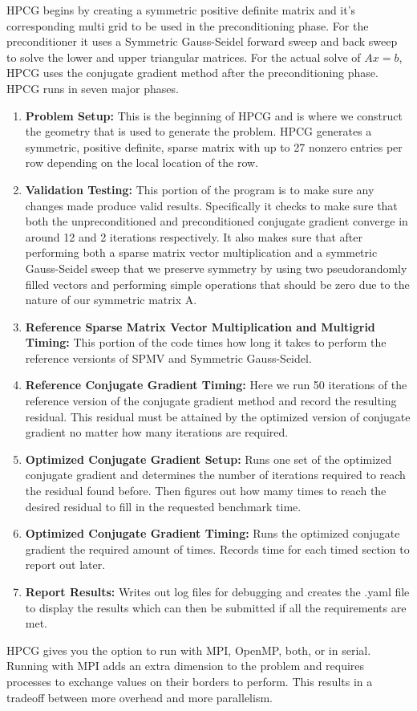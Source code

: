 \documentclass{ccr15}
\begin{document}
HPCG begins by creating a symmetric positive definite matrix and it's corresponding multi grid
to be used in the preconditioning phase. For the preconditioner it uses a Symmetric Gauss-Seidel
forward sweep and back sweep to solve the lower and upper triangular matrices. For the actual
solve of $A x = b$, HPCG uses the conjugate gradient method after the preconditioning phase.
HPCG runs in seven major phases.
\begin{enumerate}
\item \textbf{Problem Setup:} This is the beginning of HPCG and is where we construct the
geometry that is used to generate the problem. HPCG generates a symmetric, positive definite,
sparse matrix with up to 27 nonzero entries per row depending on the local location of the row.
\item \textbf{Validation Testing:} This portion of the program is to make sure any changes
made produce valid results. Specifically it checks to make sure that both the unpreconditioned
and preconditioned conjugate gradient converge in around 12 and 2 iterations respectively. It
also makes sure that after performing both a sparse matrix vector multiplication and a symmetric
Gauss-Seidel sweep that we preserve symmetry by using two pseudorandomly filled vectors and
performing simple operations that should be zero due to the nature of our symmetric matrix A.
\item \textbf{Reference Sparse Matrix Vector Multiplication and Multigrid Timing:} This
portion of the code times how long it takes to perform the reference versionts of SPMV and
Symmetric Gauss-Seidel.
\item \textbf{Reference Conjugate Gradient Timing:} Here we run 50 iterations of the reference
version of the conjugate gradient method and record the resulting residual. This residual must be
attained by the optimized version of conjugate gradient no matter how many iterations are
required.
\item \textbf{Optimized Conjugate Gradient Setup:} Runs one set of the optimized conjugate
gradient and determines the number of iterations required to reach the residual found before.
Then figures out how mamy times to reach the desired residual to fill in the requested benchmark
time.
\item \textbf{Optimized Conjugate Gradient Timing:} Runs the optimized conjugate gradient the
required amount of times. Records time for each timed section to report out later.
\item \textbf{Report Results:} Writes out log files for debugging and creates the .yaml file
to display the results which can then be submitted if all the requirements are met.
\end{enumerate}
HPCG gives you the option to run with MPI, OpenMP, both, or in serial. Running with MPI adds an
extra dimension to the problem and requires processes to exchange values on their borders to
perform. This results in a tradeoff between more overhead and more parallelism.
\end{document}
